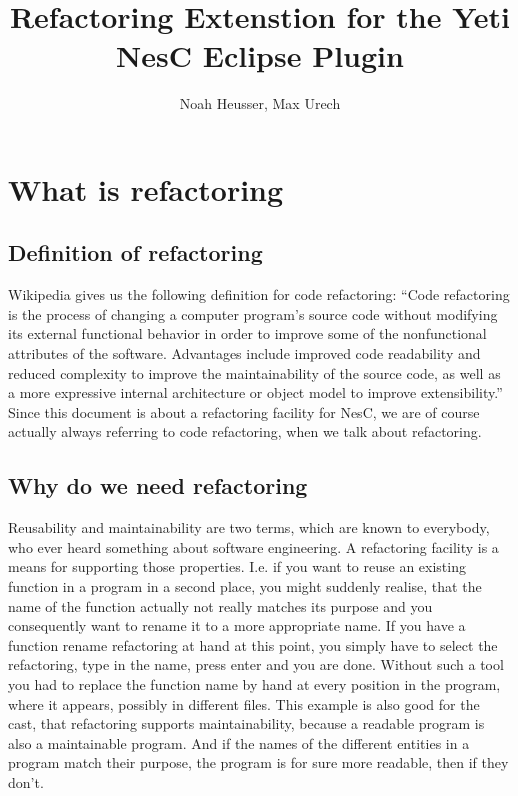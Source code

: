 \documentclass[a4paper,10pt]{report}
\title{Refactoring Extenstion for the Yeti NesC Eclipse Plugin}
\author{Noah Heusser, Max Urech}
\begin{document}
\maketitle

\begin{abstract}
\end{abstract}

\part{What is refactoring}
\chapter{Definition of refactoring}
Wikipedia gives us the following definition for code refactoring:
``Code refactoring is the process of changing a computer program's source code without modifying its external functional behavior in order to improve some of the nonfunctional attributes of the software. 
Advantages include improved code readability  and reduced complexity to improve the maintainability of the source code, as well as a more expressive internal architecture or object model to improve extensibility.''
Since this document is about a refactoring facility for NesC, we are of course actually always referring to code refactoring, when we talk about refactoring.

\chapter{Why do we need refactoring}
Reusability and maintainability are two terms, which are known to everybody, who ever heard something about software engineering. 
A refactoring facility is a means for supporting those properties. I.e. if you want to reuse an existing function in a program in a second place,
you might suddenly realise, that the name of the function actually not really matches its purpose and you consequently want to rename it to a more appropriate name.
If you have a function rename refactoring at hand at this point, you simply have to select the refactoring, type in the name, press enter and you are done. 
Without such a tool you had to replace the function name by hand at every position in the program, where it appears, possibly in different files.
This example is also good for the cast, that refactoring supports maintainability, because a readable program is also a maintainable program. 
And if the names of the different entities in a program match their purpose, the program is for sure more readable, then if they don't.
\end{document}
